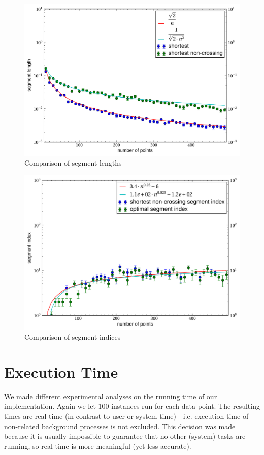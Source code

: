 \begin{landscape}
\begin{figure}[ht]
  \centering
  \includegraphics[width=\linewidth,keepaspectratio]{results/segment_length.pdf}
  \caption{\label{fig:segment_length}Comparison of segment lengths}
\end{figure}

\begin{figure}[ht]
  \centering
  \includegraphics[width=\linewidth,keepaspectratio]{results/segment_index.pdf}
  \caption{\label{fig:segment_index}Comparison of segment indices}
\end{figure}
\end{landscape}

\section{Execution Time}
We made different experimental analyses on the running time of our
implementation. Again we let 100 instances run for each data point.
The resulting times are real time (in contrast to user or system
time)---i.e. execution time of non-related background processes is
not excluded. This decision was made because it is usually impossible
to guarantee that no other (system) tasks are running, so real time
is more meaningful (yet less accurate).

